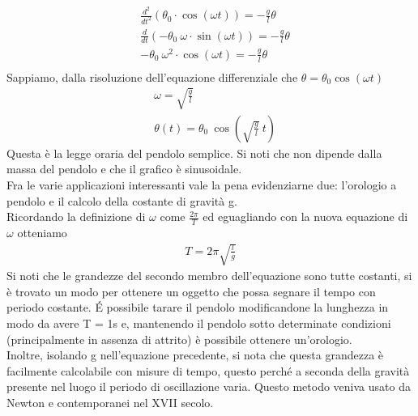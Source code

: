 \begin{align*}
&\frac{d^2}{dt^2} (\theta_0 \cdot \cos(\omega t)) = -\frac{g}{l} \theta\\
&\frac{d}{dt} (-\theta_0\ \omega \cdot \sin(\omega t)) = -\frac{g}{l} \theta\\
&-\theta_0\ \omega^2 \cdot \cos(\omega t) = -\frac{g}{l} \theta\\
\end{align*}
Sappiamo, dalla risoluzione dell'equazione differenziale che $\theta = \theta_0 \cos(\omega t)$
\begin{align*}
	&\omega = \sqrt{\frac{g}{l}}\\
	&\theta(t) = \theta_0\ \cos(\sqrt{\frac{g}{l}}\ t)
\end{align*}
Questa è la legge oraria del pendolo semplice. Si noti che non dipende dalla massa del pendolo e che il grafico è sinusoidale.\\ Fra le varie applicazioni interessanti vale la pena evidenziarne due: l'orologio a pendolo e il calcolo della costante di gravità g.\\
Ricordando la definizione di $\omega$ come $\frac{2 \pi}{T}$ ed eguagliando con la nuova equazione di $\omega$ otteniamo
\begin{align*}
T = 2\pi \sqrt{\frac{l}{g}}
\end{align*}
Si noti che le grandezze del secondo membro dell'equazione sono tutte costanti, si è trovato un modo per ottenere un oggetto che possa segnare il tempo con periodo costante. \'{E} possibile tarare il pendolo modificandone la lunghezza in modo da avere T = 1s e, mantenendo il pendolo sotto determinate condizioni (principalmente in assenza di attrito) è possibile ottenere un'orologio.\\
Inoltre, isolando g nell'equazione precedente, si nota che questa grandezza è facilmente calcolabile con misure di tempo, questo perché a seconda della gravità presente nel luogo il periodo di oscillazione varia. Questo metodo veniva usato da Newton e contemporanei nel XVII secolo.
